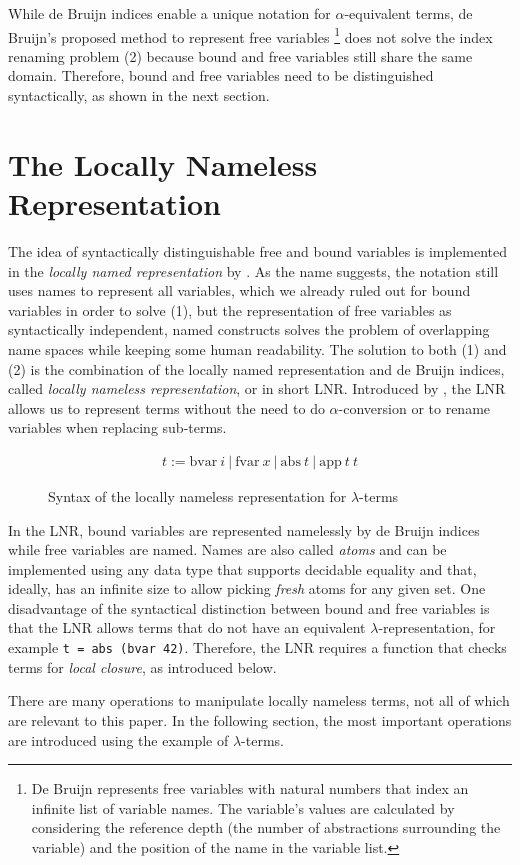 \documentclass[a4paper, 11pt, fleqn]{scrreprt}
\newcommand{\coqinline}[1]{\texttt{#1}}
\begin{document}
	\noindent
	While de Bruijn indices enable a unique notation for $\alpha$-equivalent terms, de Bruijn's proposed method to represent free variables \footnote{De Bruijn represents free variables with natural numbers that index an infinite list of variable names. The variable's values are calculated by considering the reference depth (the number of abstractions surrounding the variable) and the position of the name in the variable list.} does not solve the index renaming problem (2) because bound and free variables still share the same domain. Therefore, bound and free variables need to be distinguished syntactically, as shown in the next section.
	
	\section{The Locally Nameless Representation}
	  The idea of syntactically distinguishable free and bound variables is implemented in the \textit{locally named representation} by \citet{McKinna:1993:PTS:645891.756642}. As the name suggests, the notation still uses names to represent all variables, which we already ruled out for bound variables in order to solve (1), but the representation of free variables as syntactically independent, named constructs solves the problem of overlapping name spaces while keeping some human readability.
	  The solution to both (1) and (2) is the combination of the locally named representation and de Bruijn indices, called \textit{locally nameless representation}, or in short LNR. Introduced by \citet{Chargueraud}, the LNR allows us to represent terms without the need to do $\alpha$-conversion or to rename variables when replacing sub-terms.
	\begin{figure}[H]
		\begin{align*}
			t := \text{bvar} \ i \ | \ \text{fvar} \ x \ | \ \text{abs} \ t \ | \ \text{app} \ t \ t
		\end{align*}
		\caption{Syntax of the locally nameless representation for $\lambda$-terms}
		\label{pre:lnrsyntax}
	\end{figure}
	\noindent
	In the LNR, bound variables are represented namelessly by de Bruijn indices while free variables are named. Names are also called \textit{atoms} and can be implemented using any data type that supports decidable equality and that, ideally, has an infinite size to allow picking \textit{fresh} atoms for any given set. One disadvantage of the syntactical distinction between bound and free variables is that the LNR allows terms that do not have an equivalent $\lambda$-representation, for example \coqinline{t = abs (bvar 42)}. Therefore, the LNR requires a function that checks terms for \textit{local closure}, as introduced below.
	\par
	There are many operations to manipulate locally nameless terms, not all of which are relevant to this paper. In the following section, the most important operations are introduced using the example of $\lambda$-terms.
\end{document}
